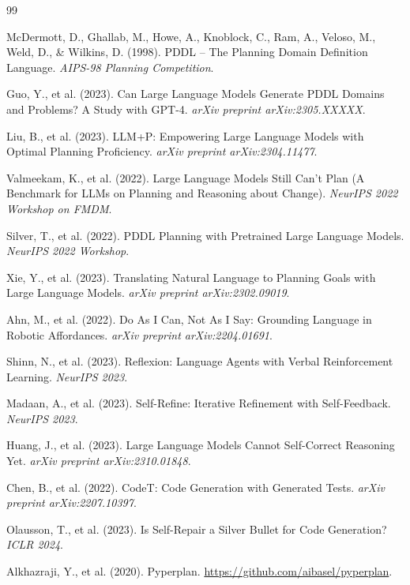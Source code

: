 \documentclass{article}
\begin{document}

\begin{thebibliography}{99}

McDermott, D., Ghallab, M., Howe, A., Knoblock, C., Ram, A., Veloso, M., Weld, D., \& Wilkins, D. (1998).
\newblock PDDL -- The Planning Domain Definition Language.
\newblock \textit{AIPS-98 Planning Competition}.

Guo, Y., et al. (2023).
\newblock Can Large Language Models Generate PDDL Domains and Problems? A Study with GPT-4.
\newblock \textit{arXiv preprint arXiv:2305.XXXXX}.

Liu, B., et al. (2023).
\newblock LLM+P: Empowering Large Language Models with Optimal Planning Proficiency.
\newblock \textit{arXiv preprint arXiv:2304.11477}.

Valmeekam, K., et al. (2022).
\newblock Large Language Models Still Can't Plan (A Benchmark for LLMs on Planning and Reasoning about Change).
\newblock \textit{NeurIPS 2022 Workshop on FMDM}.

Silver, T., et al. (2022).
\newblock PDDL Planning with Pretrained Large Language Models.
\newblock \textit{NeurIPS 2022 Workshop}.

Xie, Y., et al. (2023).
\newblock Translating Natural Language to Planning Goals with Large Language Models.
\newblock \textit{arXiv preprint arXiv:2302.09019}.

Ahn, M., et al. (2022).
\newblock Do As I Can, Not As I Say: Grounding Language in Robotic Affordances.
\newblock \textit{arXiv preprint arXiv:2204.01691}.

Shinn, N., et al. (2023).
\newblock Reflexion: Language Agents with Verbal Reinforcement Learning.
\newblock \textit{NeurIPS 2023}.

Madaan, A., et al. (2023).
\newblock Self-Refine: Iterative Refinement with Self-Feedback.
\newblock \textit{NeurIPS 2023}.

Huang, J., et al. (2023).
\newblock Large Language Models Cannot Self-Correct Reasoning Yet.
\newblock \textit{arXiv preprint arXiv:2310.01848}.

Chen, B., et al. (2022).
\newblock CodeT: Code Generation with Generated Tests.
\newblock \textit{arXiv preprint arXiv:2207.10397}.

Olausson, T., et al. (2023).
\newblock Is Self-Repair a Silver Bullet for Code Generation?
\newblock \textit{ICLR 2024}.

Alkhazraji, Y., et al. (2020).
\newblock Pyperplan.
\newblock \url{https://github.com/aibasel/pyperplan}.

\end{thebibliography}
\end{document}
